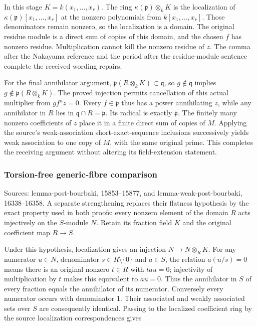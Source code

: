 In this stage \(K=k(x_1,\ldots,x_r)\). The ring \(\kappa(\mathfrak p)\otimes_kK\) is the localization of \(\kappa(\mathfrak p)[x_1,\ldots,x_r]\) at the nonzero polynomials from \(k[x_1,\ldots,x_r]\). Those denominators remain nonzero, so the localization is a domain. The original residue module is a direct sum of copies of this domain, and the chosen \(f\) has nonzero residue. Multiplication cannot kill the nonzero residue of \(z\). The comma after the Nakayama reference and the period after the residue-module sentence complete the received wording repairs.

For the final annihilator argument, \(\mathfrak p(R\otimes_kK)\subset\mathfrak q\), so \(g\notin\mathfrak q\) implies \(g\notin\mathfrak p(R\otimes_kK)\). The proved injection permits cancellation of this actual multiplier from \(gf^nz=0\). Every \(f\in\mathfrak p\) thus has a power annihilating \(z\), while any annihilator in \(R\) lies in \(\mathfrak q\cap R=\mathfrak p\). Its radical is exactly \(\mathfrak p\). The finitely many nonzero coefficients of \(z\) place it in a finite direct sum of copies of \(M\). Applying the source's weak-association short-exact-sequence inclusions successively yields weak association to one copy of \(M\), with the same original prime. This completes the receiving argument without altering its field-extension statement.

\subsubsection{Torsion-free generic-fibre comparison}\label{algebra-proof-005-torsion-free-generic-fibre-comparison}

Sources: lemma-\AlgebraIdentifierBreak{}post-\AlgebraIdentifierBreak{}bourbaki, 15853--15877, and lemma-\AlgebraIdentifierBreak{}weak-\AlgebraIdentifierBreak{}post-\AlgebraIdentifierBreak{}bourbaki, 16338--16358. A separate strengthening replaces their flatness hypothesis by the exact property used in both proofs: every nonzero element of the domain \(R\) acts injectively on the \(S\)-module \(N\). Retain its fraction field \(K\) and the original coefficient map \(R\to S\).

Under this hypothesis, localization gives an injection \(N\to N\otimes_RK\). For any numerator \(u\in N\), denominator \(s\in R\setminus\{0\}\) and \(a\in S\), the relation \(a(u/s)=0\) means there is an original nonzero \(t\in R\) with \(tau=0\); injectivity of multiplication by \(t\) makes this equivalent to \(au=0\). Thus the annihilator in \(S\) of every fraction equals the annihilator of its numerator. Conversely every numerator occurs with denominator 1. Their associated and weakly associated sets over \(S\) are consequently identical. Passing to the localized coefficient ring by the source localization correspondences gives

